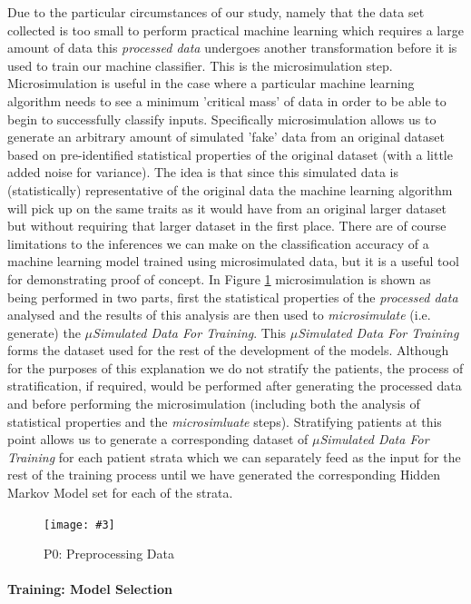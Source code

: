 \documentclass[]{article}
\newcommand\landscapeFigure[4]{
	\newgeometry{left=#1,right=#1,top=#1}
	\begin{landscape}
		\begin{figure}
			\centering
			\texttt{[image: \#3]}
			\caption{#2}
			\label{#4}
		\end{figure}
	\end{landscape}
	\restoregeometry
}
\begin{document}
Due to the particular circumstances of our study, namely that the data set collected is too small to perform practical machine learning which requires a large amount of data this \textit{processed data} undergoes another transformation before it is used to train our machine classifier. This is the microsimulation step. Microsimulation is useful in the case where a particular machine learning algorithm needs to see a minimum 'critical mass' of data in order to be able to begin to successfully classify inputs. Specifically microsimulation allows us to generate an arbitrary amount of simulated 'fake' data from an original dataset based on pre-identified statistical properties of the original dataset (with a little added noise for variance). The idea is that since this simulated data is (statistically) representative of the original data the machine learning algorithm will pick up on the same traits as it would have from an original larger dataset but without requiring that larger dataset in the first place. There are of course limitations to the inferences we can make on the classification accuracy of a machine learning model trained using microsimulated data, but it is a useful tool for demonstrating proof of concept. In Figure \ref{fig:P0} microsimulation is shown as being performed in two parts, first the statistical properties of the \textit{processed data} analysed and the results of this analysis are then used to \textit{microsimulate} (i.e. generate) the \textit{$\mu$Simulated Data For Training}. This \textit{$\mu$Simulated Data For Training} forms the dataset used for the rest of the development of the models. Although for the purposes of this explanation we do not stratify the patients, the process of stratification, if required, would be performed after generating the processed data and before performing the microsimulation (including both the analysis of statistical properties and the \textit{microsimluate} steps). Stratifying patients at this point allows us to generate a corresponding dataset of \textit{$\mu$Simulated Data For Training} for each patient strata which we can separately feed as the input for the rest of the training process until we have generated the corresponding Hidden Markov Model set for each of the strata.

\landscapeFigure{1cm}{P0: Preprocessing Data}{../modelDevelopmentFlowcharts/P0-Preprocessing_Data.png}{fig:P0}

\paragraph{Training: Model Selection}
\end{document}
